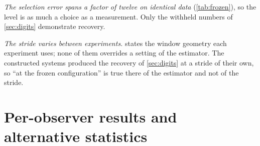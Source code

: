 \documentclass[twoside]{article}
\begin{document}
\emph{The selection error spans a factor of twelve on identical data} (\cref{tab:frozen}), so the
level is as much a choice as a measurement. Only the withheld numbers of \cref{sec:digits}
demonstrate recovery.

\emph{The stride varies between experiments.}  states the window geometry each
experiment uses; none of them overrides a setting of the estimator. The constructed systems
produced the recovery of \cref{sec:digits} at a stride of their own, so ``at the frozen
configuration'' is true there of the estimator and not of the stride.

\begin{table}[H]
\centering
\caption{The window and stride of each experiment, with their departures from the frozen
configuration of \cref{tab:frozen}. Lengths are in samples of the log; the second stride applies to
the longer records.}
\label{tab:geometry}
\end{table}

\section{Per-observer results and alternative statistics}\label{app:nulls}
\end{document}
